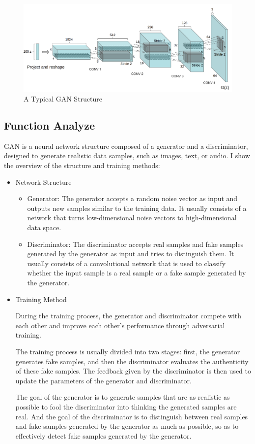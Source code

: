 \documentclass{article}
\begin{document}
\begin{figure}[!htbp]
    \centering
    \includegraphics[width=1\textwidth]{img/p2t1/GAN_struct.png}
    \caption{A Typical GAN Structure}
    \label{fig:p2_gan_struct}
\end{figure}

\subsection{Function Analyze}

GAN is a neural network structure composed of a generator and a discriminator, designed to generate realistic data samples, such as images, text, or audio. I show the overview of the structure and training methods:

\begin{itemize}
    \item {
        Network Structure
        \begin{itemize}
            \item Generator: The generator accepts a random noise vector as input and outputs new samples similar to the training data. It usually consists of a network that turns low-dimensional noise vectors to high-dimensional data space.
            \item Discriminator: The discriminator accepts real samples and fake samples generated by the generator as input and tries to distinguish them. It usually consists of a convolutional network that is used to classify whether the input sample is a real sample or a fake sample generated by the generator.
        \end{itemize}
    }
    \item {
        Training Method

        During the training process, the generator and discriminator compete with each other and improve each other's performance through adversarial training.
        
        The training process is usually divided into two stages: first, the generator generates fake samples, and then the discriminator evaluates the authenticity of these fake samples. The feedback given by the discriminator is then used to update the parameters of the generator and discriminator.

        The goal of the generator is to generate samples that are as realistic as possible to fool the discriminator into thinking the generated samples are real. And the goal of the discriminator is to distinguish between real samples and fake samples generated by the generator as much as possible, so as to effectively detect fake samples generated by the generator.
    }
\end{itemize}
\end{document}
